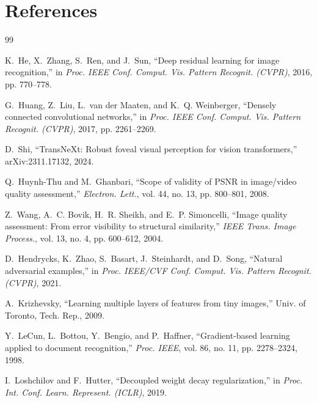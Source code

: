 \section{References}
\label{sec:references}
\renewcommand{\refname}{}

\begin{thebibliography}{99}

K.~He, X.~Zhang, S.~Ren, and J.~Sun, ``Deep residual learning for image
recognition,'' in \emph{Proc. IEEE Conf. Comput. Vis. Pattern Recognit.
(CVPR)}, 2016, pp. 770--778.

G.~Huang, Z.~Liu, L.~van der Maaten, and K.~Q. Weinberger, ``Densely connected
convolutional networks,'' in \emph{Proc. IEEE Conf. Comput. Vis. Pattern
Recognit. (CVPR)}, 2017, pp. 2261--2269.

D.~Shi, ``TransNeXt: Robust foveal visual perception for vision transformers,''
arXiv:2311.17132, 2024.

Q.~Huynh-Thu and M.~Ghanbari, ``Scope of validity of PSNR in image/video
quality assessment,'' \emph{Electron. Lett.}, vol. 44, no. 13, pp. 800--801,
2008.

Z.~Wang, A.~C. Bovik, H.~R. Sheikh, and E.~P. Simoncelli, ``Image quality
assessment: From error visibility to structural similarity,'' \emph{IEEE Trans.
Image Process.}, vol. 13, no. 4, pp. 600--612, 2004.

D.~Hendrycks, K.~Zhao, S.~Basart, J.~Steinhardt, and D.~Song, ``Natural
adversarial examples,'' in \emph{Proc. IEEE/CVF Conf. Comput. Vis. Pattern
Recognit. (CVPR)}, 2021.

A.~Krizhevsky, ``Learning multiple layers of features from tiny images,'' Univ.
of Toronto, Tech. Rep., 2009.

Y.~LeCun, L.~Bottou, Y.~Bengio, and P.~Haffner, ``Gradient-based learning
applied to document recognition,'' \emph{Proc. IEEE}, vol. 86, no. 11, pp.
2278--2324, 1998.

I.~Loshchilov and F.~Hutter, ``Decoupled weight decay regularization,'' in
\emph{Proc. Int. Conf. Learn. Represent. (ICLR)}, 2019.


\end{thebibliography}
